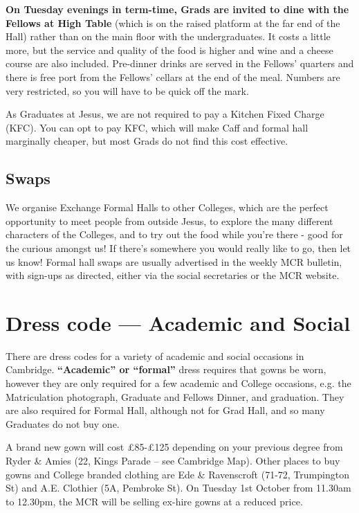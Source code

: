 \documentclass[11pt,fleqn, oneside]{book} %
\begin{document}
\textbf{On Tuesday evenings in term-time, Grads are invited to dine with the Fellows at High Table} (which is on the raised platform at the far end of the Hall) rather than on the main floor with the undergraduates. It costs a little more, but the service and quality of the food is higher and wine and a cheese course are also included. Pre-dinner drinks are served in the Fellows’ quarters and there is free port from the Fellows’ cellars at the end of the meal.  Numbers are very restricted, so you will have to be quick off the mark.

As Graduates at Jesus, we are not required to pay a Kitchen Fixed Charge (KFC). You can opt to pay KFC, which will make Caff and formal hall marginally cheaper, but most Grads do not find this cost effective. 

\subsection{Swaps}
We organise Exchange Formal Halls to other Colleges, which are the perfect opportunity to meet people from outside Jesus, to explore the many different characters of the Colleges, and to try out the food while you’re there - good for the curious amongst us! If there’s somewhere you would really like to go, then let us know!   Formal hall swaps are usually advertised in the weekly MCR bulletin, with sign-ups as directed, either via the social secretaries or the MCR website.

\section{Dress code — Academic and Social}
\label{dress}

There are dress codes for a variety of academic and social occasions in Cambridge. \textbf{“Academic” or “formal”} dress requires that gowns be worn, however they are only required for a few academic and College occasions, e.g. the Matriculation photograph, Graduate and Fellows Dinner, and graduation. They are also required for Formal Hall, although not for Grad Hall, and so many Graduates do not buy one.

A brand new gown will cost £85-£125 depending on your previous degree from Ryder \& Amies (22, Kings Parade – see Cambridge Map).  Other places to buy gowns and College branded clothing are Ede \& Ravenscroft (71-72, Trumpington St) and A.E. Clothier (5A, Pembroke St). On Tuesday 1st October from 11.30am to 12.30pm, the MCR will be selling ex-hire gowns at a reduced price. 
\end{document}
